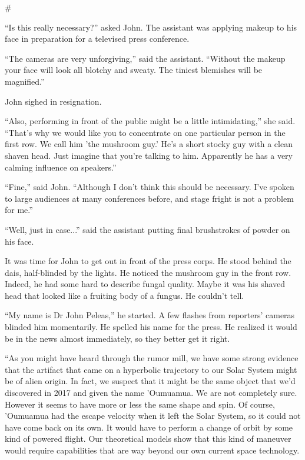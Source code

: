 \documentclass[12pt]{book}
\newcommand{\sbreak}{
\begin{center}
  \#
\end{center}
}
\begin{document}
\sbreak

``Is this really necessary?'' asked John. The assistant was applying makeup to his face in preparation for a televised press conference. 

``The cameras are very unforgiving,'' said the assistant. ``Without the makeup your face will look all blotchy and sweaty. The tiniest blemishes will be magnified.''

John sighed in resignation.

``Also, performing in front of the public might be a little intimidating,'' she said. ``That's why we would like you to concentrate on one particular person in the first row. We call him 'the mushroom guy.' He's a short stocky guy with a clean shaven head. Just imagine that you're talking to him. Apparently he has a very calming influence on speakers.''

``Fine,'' said John. ``Although I don't think this should be necessary. I've spoken to large audiences at many conferences before, and stage fright is not a problem for me.''

``Well, just in case...'' said the assistant putting final brushstrokes of powder on his face.

It was time for John to get out in front of the press corps. He stood behind the dais, half-blinded by the lights. He noticed the mushroom guy in the front row. Indeed, he had some hard to describe fungal quality. Maybe it was his shaved head that looked like a fruiting body of a fungus. He couldn't tell.

``My name is Dr John Peleas,'' he started. A few flashes from reporters' cameras blinded him momentarily. He spelled his name for the press. He realized it would be in the news almost immediately, so they better get it right.

``As you might have heard through the rumor mill, we have some strong evidence that the artifact that came on a hyperbolic trajectory to our Solar System might be of alien origin. In fact, we suspect that it might be the same object that we'd discovered in 2017 and given the name 'Oumuamua. We are not completely sure. However it seems to have more or less the same shape and spin. Of course, 'Oumuamua had the escape velocity when it left the Solar System, so it could not have come back on its own. It would have to perform a change of orbit by some kind of powered flight. Our theoretical models show that this kind of maneuver would require capabilities that are way beyond our own current space technology.
\end{document}
